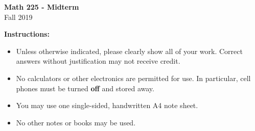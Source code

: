 \addpoints
\setlength{\parindent}{0cm}

\begin{center}

{\Large\textbf{Math 225 - Midterm}}\\
\medskip
{\Large{Fall 2019}}

\vskip1cm
\vskip0.4cm
\vskip0.4cm
\vskip0.4cm

\end{center}
\bigskip
\textbf{Instructions:}
\begin{itemize}
  \item Unless otherwise indicated, please clearly show all of your work. Correct answers without justification may not receive credit.
  \item No calculators or other electronics are permitted for use. In particular, cell phones must be turned \textbf{off} and stored away.
  \item You may use one single-sided, handwritten A4 note sheet.
  \item No other notes or books may be used.
\end{itemize}

\begin{center}
  \gradetable[h][questions]
\end{center}

\newpage
\vskip1cm
